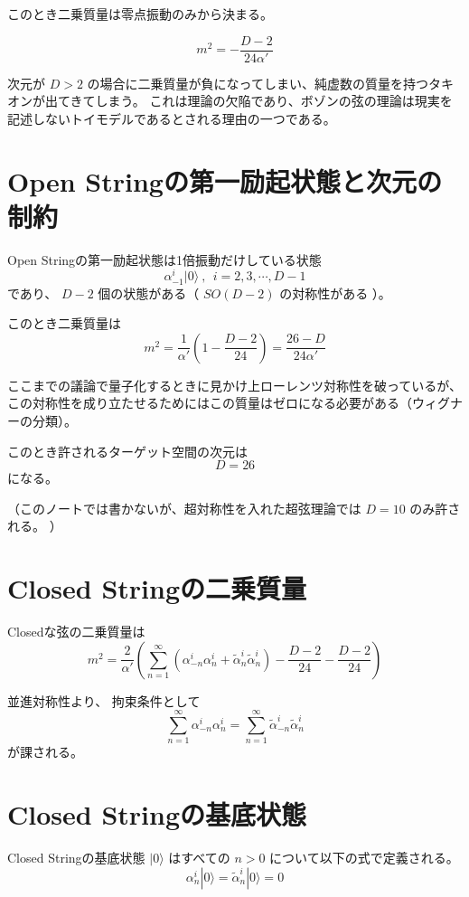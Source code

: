 \documentclass[uplatex]{jsarticle}
\begin{document}
このとき二乗質量は零点振動のみから決まる。

$$
	m^{2}
	= - \frac{D-2}{24 \alpha'}
$$

次元が
$D>2$
の場合に二乗質量が負になってしまい、純虚数の質量を持つタキオンが出てきてしまう。
これは理論の欠陥であり、ボゾンの弦の理論は現実を記述しないトイモデルであるとされる理由の一つである。

\section{Open Stringの第一励起状態と次元の制約}

Open Stringの第一励起状態は1倍振動だけしている状態
$$
	\alpha^{i}_{-1}
	| 0 \rangle
	\ , \ \ i = 2,3,\cdots, D-1
$$
であり、
$D-2$
個の状態がある（
$SO(D-2)$
の対称性がある
）。

このとき二乗質量は
$$
	m^{2}
	=
	\frac{1}{\alpha'}
	\left(
	1 - \frac{D-2}{24}
	\right)
	=
	\frac{26 - D}{24 \alpha'}
$$

ここまでの議論で量子化するときに見かけ上ローレンツ対称性を破っているが、
この対称性を成り立たせるためにはこの質量はゼロになる必要がある（ウィグナーの分類）。

このとき許されるターゲット空間の次元は
$$
	D=26
$$
になる。

（このノートでは書かないが、超対称性を入れた超弦理論では
$D=10$
のみ許される。
）

\section{Closed Stringの二乗質量}

Closedな弦の二乗質量は
$$
	m^{2}
	=
	\frac{2}{\alpha'}
	\left(
	\sum^{\infty}_{n=1}
		(
		\alpha^{i}_{-n} \alpha^{i}_{n}
		+
		\tilde{\alpha}^{i}_{n} \tilde{\alpha}^{i}_{n}
		)
	-
	\frac{D-2}{24}
	-
	\frac{D-2}{24}
	\right)
$$

並進対称性より、
拘束条件として
$$
	\sum^{\infty}_{n=1}
	\alpha^{i}_{-n} \alpha^{i}_{n}
	=
	\sum^{\infty}_{n=1}
	\tilde{\alpha}^{i}_{-n} \tilde{\alpha}^{i}_{n}
$$
が課される。

\section{Closed Stringの基底状態}

Closed Stringの基底状態
$| 0 \rangle$
はすべての
$n>0$
について以下の式で定義される。
$$
	\alpha^{i}_{n}
	| 0 \rangle
	=
	\tilde{\alpha}^{i}_{n}
	| 0 \rangle
	=
	0
$$
\end{document}
